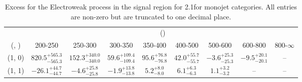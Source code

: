 \begin{table}[h!]
\tiny
\centering
\caption{Excess for the Electroweak process in the signal region for 2.1\ifb for monojet categories. All entries are non-zero but are truncated to one decimal place.\label{tab:excesssep_sig_ewk_mono}}
\begin{tabular}
{ccccccccc}
	\hline\hline
	& \multicolumn{8}{c}{\scalht (\gev)} \\ 
	 (\njet,  \nb) & 200-250 & 250-300 & 300-350 & 350-400 & 400-500 & 500-600 & 600-800 & 800-$\infty$ \\ [0.8ex] 
\hline
	(1, 0) & $820.5^{+ 565.3 }_{- 565.3 }$ & $152.3^{+ 340.0 }_{- 340.0 }$ & $59.6^{+ 109.4 }_{- 109.4 }$ & $95.6^{+ 76.8 }_{- 76.8 }$ & $42.0^{+ 55.7 }_{- 55.7 }$ & $-3.6^{+ 25.3 }_{- 25.3 }$ & $-9.5^{+ 20.1 }_{- 20.1 }$ & -- \\[0.5ex] 
	(1, 1) & $-26.1^{+ 44.7 }_{- 44.7 }$ & $-4.6^{+ 25.8 }_{- 25.8 }$ & $-1.9^{+ 13.8 }_{- 13.8 }$ & $5.2^{+ 8.0 }_{- 8.0 }$ & $6.1^{+ 6.3 }_{- 6.3 }$ & $1.1^{+ 3.2 }_{- 3.2 }$ & -- & -- \\[0.5ex] 
	\hline
	\hline
\end{tabular}
\end{table}
